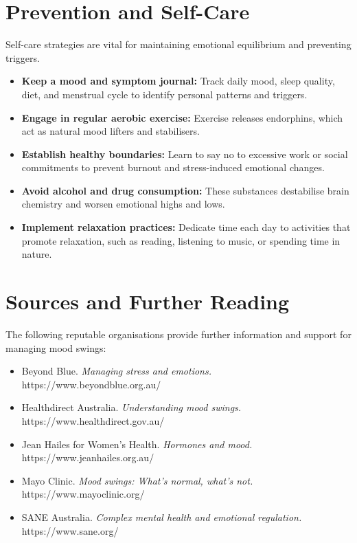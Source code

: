 \section*{Prevention and Self-Care}
Self-care strategies are vital for maintaining emotional equilibrium and preventing triggers.
\begin{itemize}
    \item \textbf{Keep a mood and symptom journal:} Track daily mood, sleep quality, diet, and menstrual cycle to identify personal patterns and triggers.
    \item \textbf{Engage in regular aerobic exercise:} Exercise releases endorphins, which act as natural mood lifters and stabilisers.
    \item \textbf{Establish healthy boundaries:} Learn to say no to excessive work or social commitments to prevent burnout and stress-induced emotional changes.
    \item \textbf{Avoid alcohol and drug consumption:} These substances destabilise brain chemistry and worsen emotional highs and lows.
    \item \textbf{Implement relaxation practices:} Dedicate time each day to activities that promote relaxation, such as reading, listening to music, or spending time in nature.
\end{itemize}

\section*{Sources and Further Reading}
The following reputable organisations provide further information and support for managing mood swings:
\begin{itemize}
    \item Beyond Blue. \textit{Managing stress and emotions.} https://www.beyondblue.org.au/
    \item Healthdirect Australia. \textit{Understanding mood swings.} https://www.healthdirect.gov.au/
    \item Jean Hailes for Women's Health. \textit{Hormones and mood.} https://www.jeanhailes.org.au/
    \item Mayo Clinic. \textit{Mood swings: What's normal, what's not.} https://www.mayoclinic.org/
    \item SANE Australia. \textit{Complex mental health and emotional regulation.} https://www.sane.org/
\end{itemize}
